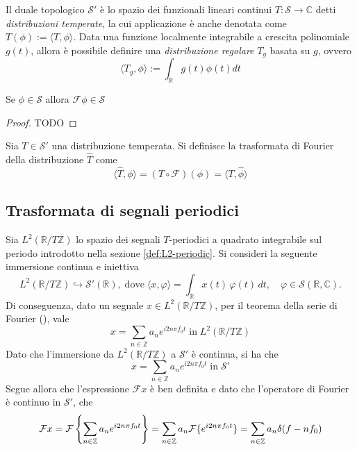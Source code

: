         Il duale topologico $\mathcal{S}'$ è lo spazio dei funzionali lineari continui $T: \mathcal{S} \rightarrow \mathbb{C}$ detti \textit{distribuzioni temperate}, la cui applicazione è anche denotata come $T(\phi) := \langle T, \phi \rangle$.
        Data una funzione localmente integrabile a crescita polinomiale $g(t)$, allora è possibile definire una \textit{distribuzione regolare} $T_g$ basata su $g$, ovvero
        \[
            \langle T_g, \phi \rangle := \int_{\mathbb{R}} g(t) \phi(t) dt
        \]

        \begin{lemma}
            Se $\phi \in \mathcal{S}$ allora $\mathcal{F} \phi \in \mathcal{S}$
        \end{lemma}

        \begin{proof}
            TODO 
        \end{proof}
    
        \begin{definition}
            Sia $T \in \mathcal{S}'$ una distribuzione temperata.
            Si definisce la trasformata di Fourier della distribuzione $\hat{T}$ come
            \[
                \langle \hat{T}, \phi \rangle = (T \circ \mathcal{F})(\phi) = \langle T, \hat{\phi} \rangle
            \]
        \end{definition}


    \subsection{Trasformata di segnali periodici}\label{sec:periodic_transform}
        Sia $L^2(\mathbb{R}/T\mathbb{Z})$ lo spazio dei segnali $T$-periodici a quadrato integrabile sul periodo introdotto nella sezione \ref{def:L2-periodic}.
        Si consideri la seguente immersione continua e iniettiva
        \[
            L^2(\mathbb{R}/T\mathbb{Z}) \hookrightarrow \mathcal{S}'(\mathbb{R}),
            \; \text{dove} \;
            \langle x, \varphi \rangle = \int_{\mathbb{R}} x(t)\, \varphi(t)\, dt,
            \quad \varphi \in \mathcal{S}(\mathbb{R}, \mathbb{C}).
        \]
        Di conseguenza, dato un segnale $x \in L^2(\mathbb{R}/T\mathbb{Z})$, per il teorema della serie di Fourier (), vale
        \[
            x = \sum_{n \in \mathbb{Z}} a_{n} e^{i 2 n \pi f_{0} t} \; \text{in} \; L^2(\mathbb{R}/T\mathbb{Z})
        \]
        Dato che l'immersione da $L^2(\mathbb{R}/T\mathbb{Z})$ a $\mathcal{S}'$ è continua, si ha che
        \[
            x = \sum_{n \in \mathbb{Z}} a_{n} e^{i 2 n \pi f_{0} t} \; \text{in} \; \mathcal{S}'
        \]
        Segue allora che l'espressione $\mathcal{F}x$ è ben definita e dato che l'operatore di Fourier è continuo in $\mathcal{S}'$, che
        \[
            \mathcal{F}x = \mathcal{F} \qty{ \sum_{n \in \mathbb{Z}} a_{n} e^{i 2 n \pi f_{0} t} } 
            = \sum_{n \in \mathbb{Z}} a_n \mathcal{F} \{ e^{i 2 n \pi f_0 t} \}
            = \sum_{n \in \mathbb{Z}} a_n \delta(f - n f_0)
        \]


